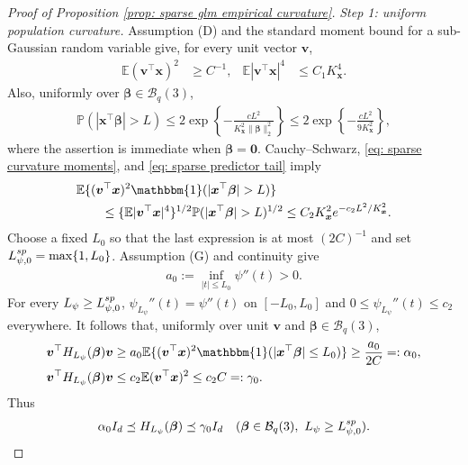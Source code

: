 \documentclass[letterpaper,12pt]{article}
\numberwithin{equation}{section}
\theoremstyle{plain}
\numberwithin{Theorem}{section}
\numberwithin{proposition}{section}
\numberwithin{Lemma}{section}
{
	\theoremstyle{definition}
	\newtheorem{Definition}{Definition}
	\newtheorem{example}{Example}
	\numberwithin{example}{section}
	\newtheorem{fact}{Fact}
	\numberwithin{fact}{section}
	\newtheorem{remark}{Remark}
}
\newcommand{\1}{\mathbbm{1}}
\def\bbeta{{\boldsymbol{\beta}}}
\def\Pr{\mathbb P}
\def\E{\mathbb{E}}
\begin{document}
\begin{proof}[Proof of Proposition \ref{prop: sparse glm empirical curvature}]
\textit{Step 1: uniform population curvature.}
Assumption (D) and the standard moment bound for a sub-Gaussian random
variable give, for every unit vector $\bm v$,
\begin{align}
\E(\bm v^\top\bm x)^2&\geq C^{-1},&
\E|\bm v^\top\bm x|^4&\leq C_1K_{\bm x}^4.                 \label{eq: sparse curvature moments}
\end{align}
Also, uniformly over $\bbeta\in\mathcal B_q(3)$,
\begin{align}
\Pr(|\bm x^\top\bbeta|>L)
\leq2\exp\left\{-\frac{cL^2}{K_{\bm x}^2\|\bbeta\|_2^2}\right\}
\leq2\exp\left\{-\frac{cL^2}{9K_{\bm x}^2}\right\},      \label{eq: sparse predictor tail}
\end{align}
where the assertion is immediate when $\bbeta=\bm0$.
Cauchy--Schwarz, \eqref{eq: sparse curvature moments}, and
\eqref{eq: sparse predictor tail} imply
\begin{align*}
&\E\{(\bm v^\top\bm x)^2
\1(|\bm x^\top\bbeta|>L)\}\\
&\qquad\leq
\{\E|\bm v^\top\bm x|^4\}^{1/2}
\Pr(|\bm x^\top\bbeta|>L)^{1/2}
\leq C_2K_{\bm x}^2e^{-c_2L^2/K_{\bm x}^2}.
\end{align*}
Choose a fixed $L_0$ so that the last expression is at most
$(2C)^{-1}$ and set $L_{\psi,0}^{\rm sp}=\max\{1,L_0\}$.
Assumption (G) and continuity give
\begin{align*}
a_0:=\inf_{|t|\leq L_0}\psi''(t)>0.
\end{align*}
For every $L_\psi\geq L_{\psi,0}^{\rm sp}$,
$\psi_{L_\psi}''(t)=\psi''(t)$ on $[-L_0,L_0]$ and
$0\leq\psi_{L_\psi}''(t)\leq c_2$ everywhere. It follows that,
uniformly over unit $\bm v$ and $\bbeta\in\mathcal B_q(3)$,
\begin{align*}
\bm v^\top H_{L_\psi}(\bbeta)\bm v
&\geq a_0\E\{(\bm v^\top\bm x)^2
\1(|\bm x^\top\bbeta|\leq L_0)\}
\geq\frac{a_0}{2C}=:\alpha_0,\\
\bm v^\top H_{L_\psi}(\bbeta)\bm v
&\leq c_2\E(\bm v^\top\bm x)^2
\leq c_2C=:\gamma_0.
\end{align*}
Thus
\begin{align}
\alpha_0I_d\preceq H_{L_\psi}(\bbeta)\preceq\gamma_0I_d
\quad(\bbeta\in\mathcal B_q(3),\
L_\psi\geq L_{\psi,0}^{\rm sp}).                           \label{eq: sparse population curvature}
\end{align}


\end{proof}
\end{document}
